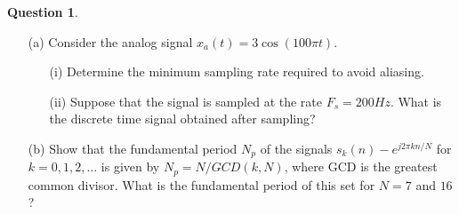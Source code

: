 \documentclass[12pt]{article}
\theoremstyle{definition}
\newtheorem{question}{Question}
\begin{document}
\begin{question}
    \begin{enumerate}
        \item[(a)] Consider the analog signal $x_a(t) = 3 \cos(100 \pi t)$. 
        \begin{enumerate}
            \item[(i)] Determine the minimum sampling rate required to avoid aliasing.
            \item[(ii)] Suppose that the signal is sampled at the rate $F_s = 200 Hz$. What is the discrete time signal obtained after sampling?
        \end{enumerate}
        \item[(b)] Show that the fundamental period $N_p$ of the signals $s_k(n) - e^{j 2\pi kn/N}$ for $k = 0, 1, 2, \dots$ is given by $N_p = N / GCD(k, N)$, where GCD is the greatest common divisor. What is the fundamental period of this set for $N = 7$ and $16$? 
    \end{enumerate}
\end{question}
\end{document}
